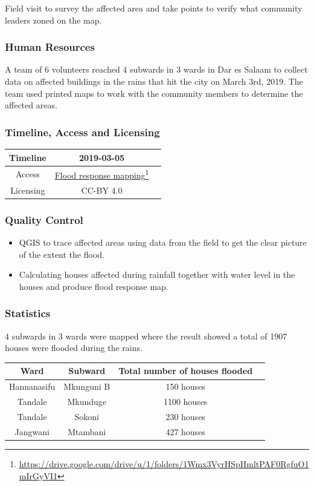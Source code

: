 \documentclass[a4paper,12pt,twoside]{article}
\begin{document}
Field visit to survey the affected area and take points to verify what community leaders zoned on the map.

\subsubsection{Human Resources}
A team of 6 volunteers reached 4 subwards in 3 wards in Dar es Salaam to collect data on affected buildings in the rains that hit the city on March 3rd, 2019. The team used printed maps to work with the community members to determine the affected areas.

\subsubsection{Timeline, Access and Licensing}
\begin{center}
\begin{tabular}{|c|c|c|}  
 \hline
  Timeline  &  2019-03-05 \\
\hline  
 Access  & 
   \href{https://drive.google.com/drive/u/1/folders/1Wmx3VyrHSpHmltPAF0RgfuO1mIrGyVI1}{Flood response mapping}\footnote{\url{https://drive.google.com/drive/u/1/folders/1Wmx3VyrHSpHmltPAF0RgfuO1mIrGyVI1}} \\
  
\hline
Licensing   &  CC-BY 4.0 \\
\hline

\end{tabular}
\end{center}

\subsubsection{Quality Control}
\begin{itemize}
    \item QGIS to trace affected areas using data from the field to get the clear picture of the extent the flood. 
   \item Calculating houses affected during rainfall together with  water level in the houses  and produce flood response map.
\end{itemize}

\subsubsection{Statistics}
4 subwards in 3 wards were mapped where the result showed a total of 1907 houses were flooded during the rains.
\begin{center}
\begin{tabular}{|c|c|c|c|}
\hline
\bfseries Ward & \bfseries Subward & \bfseries Total number of houses flooded \\
\hline
Hannanasifu & Mkunguni B & 150 houses \\
\hline
Tandale & Mkunduge & 1100 houses \\
\hline
Tandale & Sokoni & 230 houses \\
\hline
Jangwani & Mtambani & 427 houses \\
\hline
\end{tabular}
\end{center}
\end{document}
